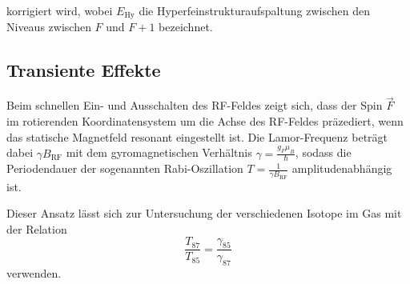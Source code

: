   korrigiert wird, wobei $E_\text{Hy}$ die Hyperfeinstrukturaufspaltung zwischen den Niveaus zwischen $F$ und $F+1$ bezeichnet.

  \subsection{Transiente Effekte}
  \label{subsec:transient}
  Beim schnellen Ein- und Ausschalten des RF-Feldes zeigt sich, dass der Spin $\vec{F}$ im rotierenden Koordinatensystem um die Achse des RF-Feldes präzediert, wenn das statische Magnetfeld resonant eingestellt ist. Die Lamor-Frequenz beträgt dabei $\gamma B_{\text{RF}}$ mit dem gyromagnetischen Verhältnis $\gamma = \frac{g_F \mu_B}{\hbar}$, sodass die Periodendauer der sogenannten Rabi-Oszillation $T=\frac{1}{\gamma B_\text{RF}}$ amplitudenabhängig ist.

  Dieser Ansatz lässt sich zur Untersuchung der verschiedenen Isotope im Gas mit der Relation
  \begin{equation}
    \frac{T_{87}}{T_{85}} = \frac{\gamma_{85}}{\gamma_{87}}
    \label{eqn:transient}
  \end{equation}
  verwenden.
